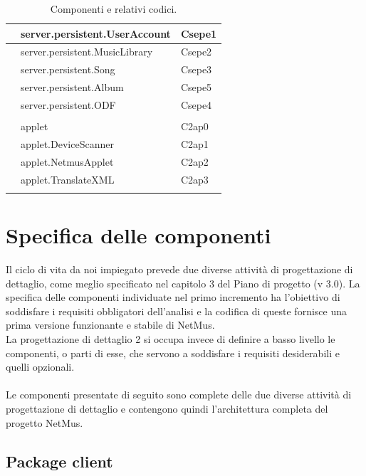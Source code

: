 \begin{footnotesize}
\begin{longtable}[h]{|l|l|l|}
& server.persistent.UserAccount  &  Csepe1 \\\hline 
& server.persistent.MusicLibrary  &  Csepe2 \\\hline 
& server.persistent.Song  &  Csepe3 \\\hline 
\bo{+} & server.persistent.Album  &  Csepe5 \\\hline 
\bo{+} & server.persistent.ODF  &  Csepe4 \\\hline 
&&\\\hline
\bo{+} & applet  &  C2ap0 \\\hline
\bo{+} & applet.DeviceScanner  &  C2ap1 \\\hline
\bo{+} & applet.NetmusApplet  &  C2ap2 \\\hline
\bo{+} & applet.TranslateXML  &  C2ap3 \\\hline
\caption{Componenti e relativi codici.}
\centering
\end{longtable}
\end{footnotesize}

\chapter{Specifica delle componenti}
\thispagestyle{fancy} %
Il ciclo di vita da noi impiegato prevede due diverse attivit\`a di
progettazione di dettaglio, come meglio specificato nel capitolo 3 del Piano di progetto (v 3.0). La specifica
delle componenti individuate nel primo incremento ha l'obiettivo di soddisfare i
requisiti obbligatori dell'analisi e la codifica di
queste fornisce una prima versione funzionante e stabile di NetMus. \\
La progettazione di dettaglio 2 si occupa invece di definire a basso livello le
componenti, o parti di esse, che servono a soddisfare i requisiti desiderabili e
quelli opzionali.\\\\
Le componenti presentate di seguito sono complete delle due diverse attivit\`a
di progettazione di dettaglio e contengono quindi l'architettura completa del
progetto NetMus.

\newpage
\section{Package client}

